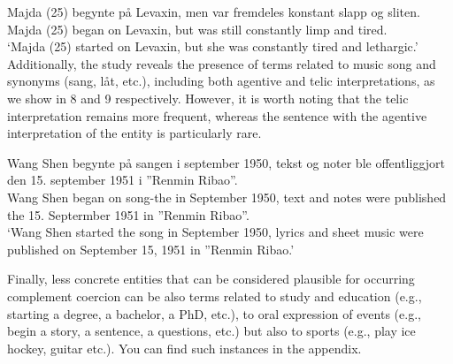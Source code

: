\documentclass{article}
\begin{document}
    \gll Majda (25) begynte på Levaxin, men var fremdeles konstant slapp og sliten.\\
         Majda (25) began on Levaxin, but was still constantly limp and tired.\\
    \glt ‘Majda (25) started on Levaxin, but she was constantly tired and lethargic.’
    \z
Additionally, the study reveals the presence of terms related to music song and synonyms (sang, låt, etc.), including both agentive and telic interpretations, as we show in  8 and 9 respectively. However, it is worth noting that the telic interpretation remains more frequent, whereas the sentence with the agentive interpretation of the entity is particularly rare. %

    \ea \label{sent:initiation_paa_4} %

    \gll Wang Shen begynte på sangen i september 1950, tekst og noter ble offentliggjort den 15. september 1951 i ''Renmin Ribao''.\\
         Wang Shen began on song-the in September 1950, text and notes were published the 15. Septermber 1951 in ''Renmin Ribao''.\\
    \glt ‘Wang Shen started the song in September 1950, lyrics and sheet music were published on September 15, 1951 in ''Renmin Ribao.’
    \z

Finally, less concrete entities that can be considered plausible for occurring complement coercion can be also terms related to study and education (e.g., starting a degree, a bachelor, a PhD, etc.), to oral expression of events (e.g., begin a story, a sentence, a questions, etc.) but also to sports (e.g., play ice hockey, guitar etc.). You can find such instances in the appendix. 
\end{document}
